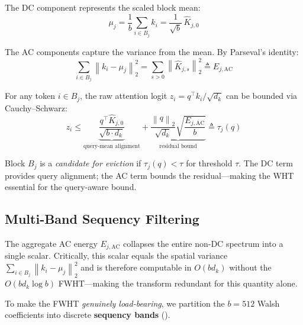 \documentclass[conference,10pt]{IEEEtran}
\newcommand{\norm}[1]{\left\|#1\right\|}
\begin{document}
The DC component represents the scaled block mean:
\begin{equation}\label{eq:dc}
    \mu_j = \frac{1}{b}\sum_{i \in B_j} k_i
          = \frac{1}{\sqrt{b}}\,\hat{K}_{j,0}
\end{equation}

The AC components capture the variance from the mean. By Parseval's identity:
\begin{equation}\label{eq:ac_energy}
    \sum_{i \in B_j} \norm{k_i - \mu_j}_2^2
    = \sum_{s > 0} \norm{\hat{K}_{j,s}}_2^2
    \triangleq E_{j,\text{AC}}
\end{equation}

For any token $i \in B_j$, the raw attention logit
$z_i = q^\top k_i / \sqrt{d_k}$ can be bounded via Cauchy--Schwarz:
\begin{equation}\label{eq:logit_bound}
    z_i \leq \underbrace{\frac{q^\top \hat{K}_{j,0}}{\sqrt{b \cdot d_k}}}_{\text{query-mean alignment}}
         + \underbrace{\frac{\norm{q}_2}{\sqrt{d_k}}\sqrt{\frac{E_{j,\text{AC}}}{b}}}_{\text{residual bound}}
    \triangleq \tau_j(q)
\end{equation}

Block $B_j$ is a \emph{candidate for eviction} if
$\tau_j(q) < \tau$ for threshold $\tau$. The DC term provides query alignment;
the AC term bounds the residual---making the WHT essential for the query-aware
bound.

\subsection{Multi-Band Sequency Filtering}\label{sec:multiband}

The aggregate AC energy $E_{j,\text{AC}}$ collapses the entire non-DC spectrum
into a single scalar. Critically, this scalar equals the spatial variance
$\sum_{i \in B_j} \norm{k_i - \mu_j}_2^2$ and is therefore computable in
$O(bd_k)$ without the $O(bd_k \log b)$ FWHT---making the transform redundant
for this quantity alone.

To make the FWHT \emph{genuinely load-bearing}, we partition the $b = 512$
Walsh coefficients into discrete \textbf{sequency bands}
().
\end{document}
